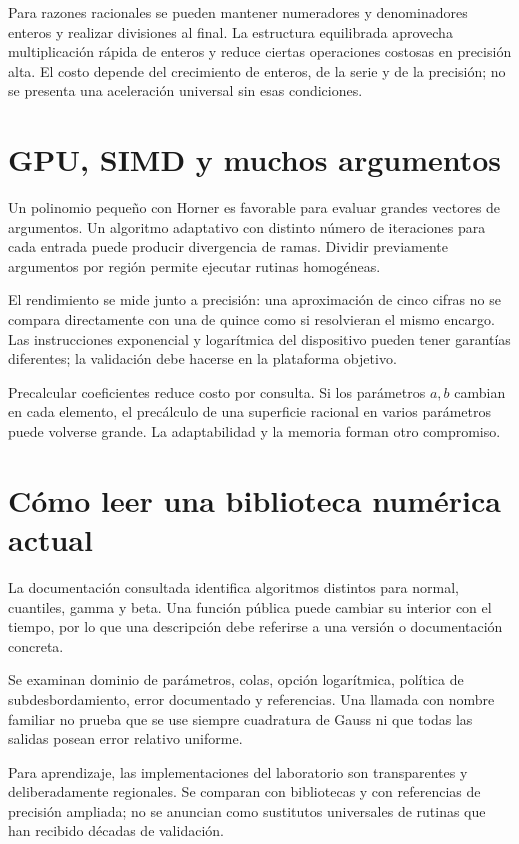 \documentclass[11pt,a4paper]{article}
\theoremstyle{definition}
\begin{document}
Para razones racionales se pueden mantener numeradores y denominadores enteros y realizar divisiones al final. La estructura equilibrada aprovecha multiplicación rápida de enteros y reduce ciertas operaciones costosas en precisión alta. El costo depende del crecimiento de enteros, de la serie y de la precisión; no se presenta una aceleración universal sin esas condiciones.

\section{GPU, SIMD y muchos argumentos}
Un polinomio pequeño con Horner es favorable para evaluar grandes vectores de argumentos. Un algoritmo adaptativo con distinto número de iteraciones para cada entrada puede producir divergencia de ramas. Dividir previamente argumentos por región permite ejecutar rutinas homogéneas.

El rendimiento se mide junto a precisión: una aproximación de cinco cifras no se compara directamente con una de quince como si resolvieran el mismo encargo. Las instrucciones exponencial y logarítmica del dispositivo pueden tener garantías diferentes; la validación debe hacerse en la plataforma objetivo.

Precalcular coeficientes reduce costo por consulta. Si los parámetros $a,b$ cambian en cada elemento, el precálculo de una superficie racional en varios parámetros puede volverse grande. La adaptabilidad y la memoria forman otro compromiso.

\section{Cómo leer una biblioteca numérica actual}
La documentación consultada identifica algoritmos distintos para normal, cuantiles, gamma y beta. Una función pública puede cambiar su interior con el tiempo, por lo que una descripción debe referirse a una versión o documentación concreta.

Se examinan dominio de parámetros, colas, opción logarítmica, política de subdesbordamiento, error documentado y referencias. Una llamada con nombre familiar no prueba que se use siempre cuadratura de Gauss ni que todas las salidas posean error relativo uniforme.

Para aprendizaje, las implementaciones del laboratorio son transparentes y deliberadamente regionales. Se comparan con bibliotecas y con referencias de precisión ampliada; no se anuncian como sustitutos universales de rutinas que han recibido décadas de validación.
\end{document}
